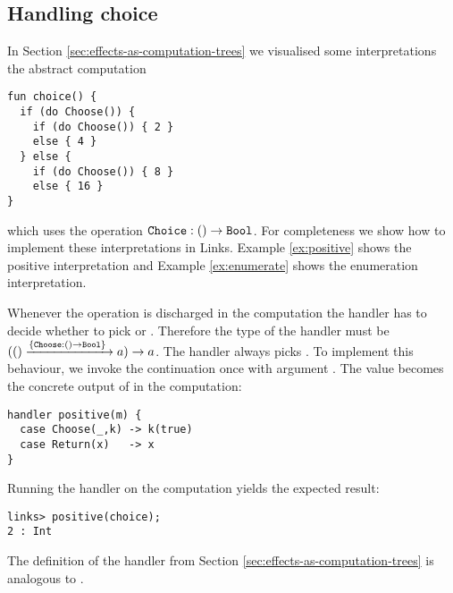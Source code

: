 
\subsection{Handling choice}\label{sec:choice}
In Section \ref{sec:effects-as-computation-trees} we visualised some interpretations the abstract computation
\begin{lstlisting}[style=links]
fun choice() {
  if (do Choose()) {
    if (do Choose()) { 2 }
    else { 4 }
  } else {
    if (do Choose()) { 8 }
    else { 16 }
}
\end{lstlisting}
which uses the operation $\texttt{Choice} : () \to \texttt{Bool}$. For completeness we show how to implement these interpretations in Links. Example \ref{ex:positive} shows the positive interpretation and Example \ref{ex:enumerate} shows the enumeration interpretation.
\begin{example}\label{ex:positive}
Whenever the operation  is discharged in the computation  the handler has to decide whether to pick  or . Therefore the type of the handler  must be
$(() \xrightarrow{\{\texttt{Choose}:() \to \texttt{Bool}\}\;} a) \to a$.
The  handler always picks . To implement this behaviour, we invoke the continuation once with argument . The value  becomes the concrete output of  in the computation:
\begin{lstlisting}[style=links]
handler positive(m) {
  case Choose(_,k) -> k(true)
  case Return(x)   -> x
}
\end{lstlisting}
Running the handler on the computation  yields the expected result:
\begin{lstlisting}[style=links]
links> positive(choice);
2 : Int
\end{lstlisting}
The definition of the handler  from Section \ref{sec:effects-as-computation-trees} is analogous to .
\end{example}


